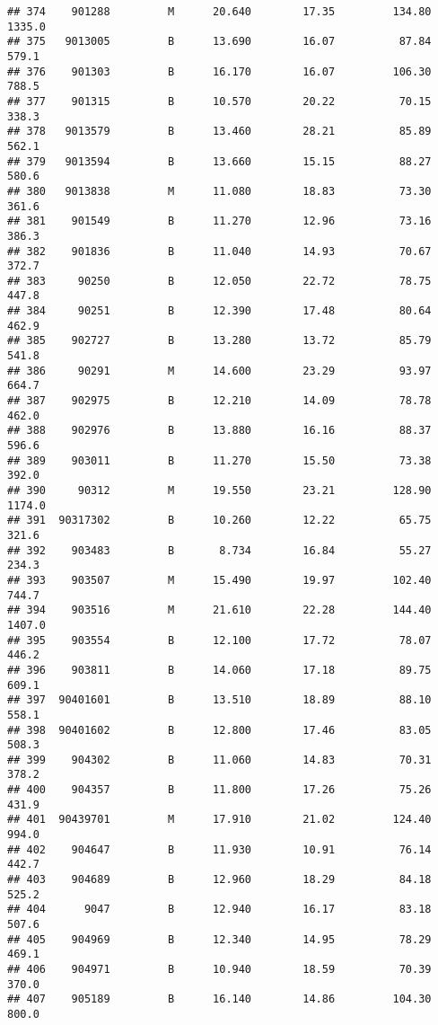 \documentclass[
]{article}
\begin{document}
\begin{verbatim}
## 374    901288         M      20.640        17.35         134.80    1335.0
## 375   9013005         B      13.690        16.07          87.84     579.1
## 376    901303         B      16.170        16.07         106.30     788.5
## 377    901315         B      10.570        20.22          70.15     338.3
## 378   9013579         B      13.460        28.21          85.89     562.1
## 379   9013594         B      13.660        15.15          88.27     580.6
## 380   9013838         M      11.080        18.83          73.30     361.6
## 381    901549         B      11.270        12.96          73.16     386.3
## 382    901836         B      11.040        14.93          70.67     372.7
## 383     90250         B      12.050        22.72          78.75     447.8
## 384     90251         B      12.390        17.48          80.64     462.9
## 385    902727         B      13.280        13.72          85.79     541.8
## 386     90291         M      14.600        23.29          93.97     664.7
## 387    902975         B      12.210        14.09          78.78     462.0
## 388    902976         B      13.880        16.16          88.37     596.6
## 389    903011         B      11.270        15.50          73.38     392.0
## 390     90312         M      19.550        23.21         128.90    1174.0
## 391  90317302         B      10.260        12.22          65.75     321.6
## 392    903483         B       8.734        16.84          55.27     234.3
## 393    903507         M      15.490        19.97         102.40     744.7
## 394    903516         M      21.610        22.28         144.40    1407.0
## 395    903554         B      12.100        17.72          78.07     446.2
## 396    903811         B      14.060        17.18          89.75     609.1
## 397  90401601         B      13.510        18.89          88.10     558.1
## 398  90401602         B      12.800        17.46          83.05     508.3
## 399    904302         B      11.060        14.83          70.31     378.2
## 400    904357         B      11.800        17.26          75.26     431.9
## 401  90439701         M      17.910        21.02         124.40     994.0
## 402    904647         B      11.930        10.91          76.14     442.7
## 403    904689         B      12.960        18.29          84.18     525.2
## 404      9047         B      12.940        16.17          83.18     507.6
## 405    904969         B      12.340        14.95          78.29     469.1
## 406    904971         B      10.940        18.59          70.39     370.0
## 407    905189         B      16.140        14.86         104.30     800.0

\end{verbatim}
\end{document}

